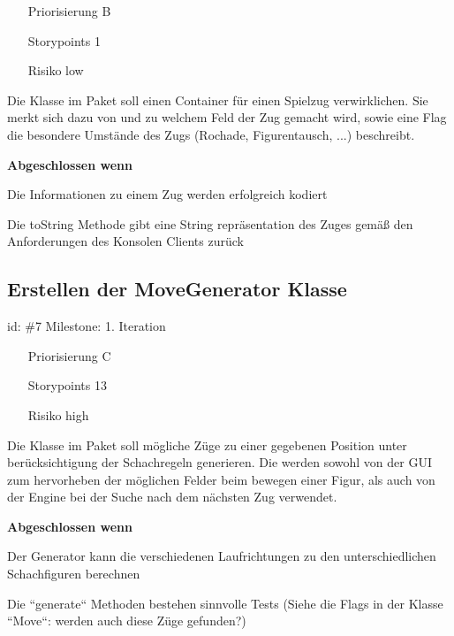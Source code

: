 \begin{itemize}
\item[Priorisierung] B
\item[Storypoints] 1
\item[Risiko] low
\end{itemize}

Die  Klasse im Paket  soll einen Container für einen Spielzug verwirklichen. Sie merkt sich dazu von und zu welchem Feld der Zug gemacht wird, sowie eine Flag die besondere Umstände des Zugs (Rochade, Figurentausch, ...) beschreibt.

\textbf{Abgeschlossen wenn}
\begin{todolist}
    \item[\done]  Die Informationen zu einem Zug werden erfolgreich kodiert
  \item[\done]  Die toString Methode gibt eine String repräsentation des Zuges gemäß den Anforderungen des Konsolen Clients zurück

\end{todolist}


\subsection*{Erstellen der MoveGenerator Klasse}
id: \#7 Milestone: 1. Iteration\\

\begin{itemize}
\item[Priorisierung] C
\item[Storypoints] 13
\item[Risiko] high
\end{itemize}

Die  Klasse im Paket  soll mögliche Züge zu einer gegebenen Position unter berücksichtigung der Schachregeln generieren. Die werden sowohl von der GUI zum hervorheben der möglichen Felder beim bewegen einer Figur, als auch von der Engine bei der Suche nach dem nächsten Zug verwendet.

\textbf{Abgeschlossen wenn}
\begin{todolist}
    \item[\done]  Der Generator kann die verschiedenen Laufrichtungen zu den unterschiedlichen Schachfiguren berechnen
  \item[\done]  Die ``generate`` Methoden bestehen sinnvolle Tests (Siehe die Flags in der Klasse ``Move``: werden auch diese Züge gefunden?)

\end{todolist}


